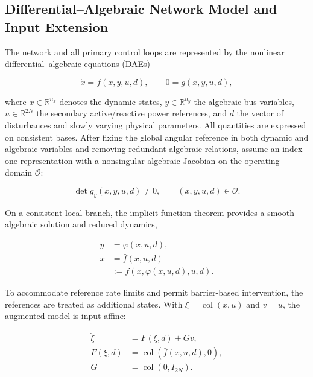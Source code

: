 \documentclass[11pt,twocolumn]{article}
\begin{document}
\subsection{Differential--Algebraic Network Model and Input Extension}

\label{subsec:model}

The network and all primary control loops are represented by the nonlinear differential--algebraic equations (DAEs)

\begin{equation}\label{eq:dae}
\dot x=f(x,y,u,d),\qquad 0=g(x,y,u,d),
\end{equation}

where $x\in\mathbb R^{n_x}$ denotes the dynamic states, $y\in\mathbb R^{n_y}$ the algebraic bus variables, $u\in\mathbb R^{2N}$ the secondary active/reactive power references, and $d$ the vector of disturbances and slowly varying physical parameters. All quantities are expressed on consistent bases. After fixing the global angular reference in both dynamic and algebraic variables and removing redundant algebraic relations, assume an index-one representation with a nonsingular algebraic Jacobian on the operating domain $\mathcal O$:

\begin{equation}\label{eq:regularity}
\det g_y(x,y,u,d)\neq 0,\qquad (x,y,u,d)\in\mathcal O.
\end{equation}

On a consistent local branch, the implicit-function theorem provides a smooth algebraic solution and reduced dynamics,

\begin{equation}\label{eq:reduced}
\begin{aligned}
y&=\varphi(x,u,d),\\
\dot x&=\bar f(x,u,d)\\
&:=f(x,\varphi(x,u,d),u,d).
\end{aligned}
\end{equation}

To accommodate reference rate limits and permit barrier-based intervention, the references are treated as additional states. With $\xi=\operatorname{col}(x,u)$ and $v=\dot u$, the augmented model is input affine:

\begin{equation}\label{eq:augmented}
\begin{aligned}
\dot\xi&=F(\xi,d)+Gv,\\
F(\xi,d)&=\operatorname{col}(\bar f(x,u,d),0),\\
G&=\operatorname{col}(0,I_{2N}).
\end{aligned}
\end{equation}
\end{document}
